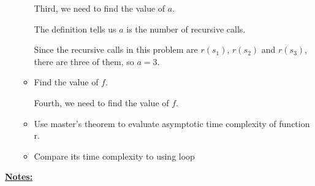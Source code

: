 \documentclass[12pt]{article}
\begin{document}
\begin{itemize}
\begin{mdframed}
\begin{itemize}
        Third, we need to find the value of $a$.

        \bigskip

        \begin{mdframed}
        The definition tells us $a$ is the number of recursive calls.

        \bigskip

        Since the recursive calls in this problem are $r(s_1)$, $r(s_2)$ and $r(s_3)$,
        there are three of them, so $a = 3$.
        \end{mdframed}

        \item Find the value of $f$.

        \bigskip

        Fourth, we need to find the value of $f$.

        \bigskip

        \begin{mdframed}

        \end{mdframed}

        \item Use master's theorem to evaluate asymptotic time complexity of function r.
        \item Compare its time complexity to using loop
    \end{itemize}
    \end{mdframed}

\end{itemize}

\bigskip

\underline{\textbf{Notes:}}

\bigskip
\end{document}
